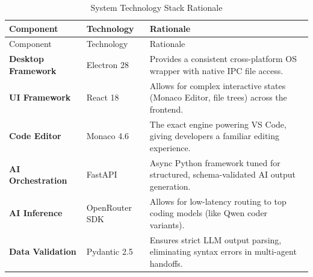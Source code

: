 \documentclass[
  12pt,
]{article}
\begin{document}
\begin{longtable}[]{@{}
  >{\raggedright\arraybackslash}p{}
  >{\raggedright\arraybackslash}p{}
  >{\raggedright\arraybackslash}p{}@{}}
\caption{System Technology Stack Rationale}\tabularnewline
\toprule\noalign{}
\begin{minipage}[b]{\linewidth}\raggedright
Component
\end{minipage} & \begin{minipage}[b]{\linewidth}\raggedright
Technology
\end{minipage} & \begin{minipage}[b]{\linewidth}\raggedright
Rationale
\end{minipage} \\
\midrule\noalign{}
\endfirsthead
\toprule\noalign{}
\begin{minipage}[b]{\linewidth}\raggedright
Component
\end{minipage} & \begin{minipage}[b]{\linewidth}\raggedright
Technology
\end{minipage} & \begin{minipage}[b]{\linewidth}\raggedright
Rationale
\end{minipage} \\
\midrule\noalign{}
\endhead
\bottomrule\noalign{}
\endlastfoot
\textbf{Desktop Framework} & Electron 28 & Provides a consistent
cross-platform OS wrapper with native IPC file access. \\
\textbf{UI Framework} & React 18 & Allows for complex interactive states
(Monaco Editor, file trees) across the frontend. \\
\textbf{Code Editor} & Monaco 4.6 & The exact engine powering VS Code,
giving developers a familiar editing experience. \\
\textbf{AI Orchestration} & FastAPI & Async Python framework tuned for
structured, schema-validated AI output generation. \\
\textbf{AI Inference} & OpenRouter SDK & Allows for low-latency routing
to top coding models (like Qwen coder variants). \\
\textbf{Data Validation} & Pydantic 2.5 & Ensures strict LLM output
parsing, eliminating syntax errors in multi-agent handoffs. \\
\end{longtable}

\newpage
\end{document}
